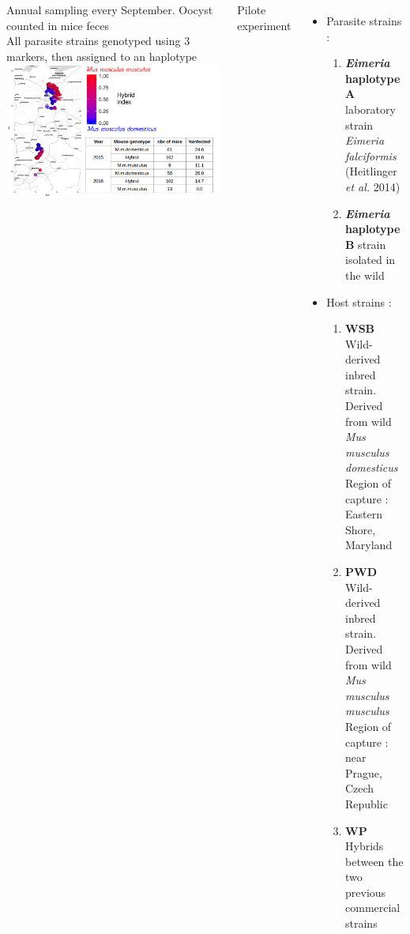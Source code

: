 \documentclass[30pt, a0paper, portrait, margin=0mm, innermargin=15mm,
               blockverticalspace=15mm, colspace=15mm, subcolspace=8mm]{tikzposter}
\begin{document}
\begin{columns}
{
 Annual sampling every September. Oocyst counted in mice feces\\ All parasite strains genotyped using 3 markers, then assigned to an haplotype \includegraphics[scale=1]{map.pdf}
    }


      {Pilote experiment
      \begin{itemize}
      
      \item Parasite strains :
      
      \begin{enumerate}
      \item \textbf{\textit{Eimeria} haplotype A} laboratory strain \textit{Eimeria falciformis} (Heitlinger \textit{et al.} 2014)
      \item \textbf{\textit{Eimeria} haplotype B} strain isolated in the wild 
      \end{enumerate}
      
      \item Host strains :
      
      \begin{enumerate}
      \item \textbf{WSB} Wild-derived inbred strain. Derived from wild \textit{Mus musculus domesticus}\\ Region of capture : Eastern Shore, Maryland
      \item \textbf{PWD} Wild-derived inbred strain. Derived from wild \textit{Mus musculus musculus}\\ Region of capture : near Prague, Czech Republic
      \item \textbf{WP} Hybrids between the two previous commercial strains
      \end{enumerate}
      

\end{itemize}}
\end{columns}
\end{document}
